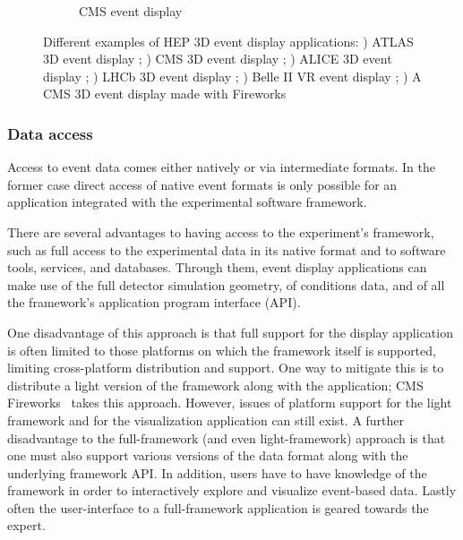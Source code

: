 \documentclass[12pt,a4paper]{article}
\begin{document}
\begin{figure}
\begin{subfigure}[b]{0.475\textwidth}
		\caption[CMS event display]%
		{{\small CMS event display}}
		\label{fig:ed-cms-fireworks}
	\end{subfigure}
	\caption[Examples of HEP event displays]
	{\small Different examples of HEP 3D event display applications: ) ATLAS 3D event display \cite{ATLASED072015,ATLASVP12010};
	) CMS 3D event display \cite{CMSED}; 
	) ALICE 3D event display \cite{ALICEED};
	) LHCb 3D event display \cite{LHCbED}; ) Belle II VR event display \cite{BelleIIVRED}; 
	) A CMS 3D event display made with Fireworks~\cite{CMSFireworks}}
	\label{fig:screenshots}
\end{figure}



\hypertarget{data-access}{%
\subsubsection{Data access}\label{data-access}}

Access to event data comes either natively or via intermediate formats. In the former case direct access of native event formats
is only possible for an application integrated with the experimental software framework.

There are several advantages to having access to the experiment's framework, such as full access to the experimental
data in its native format and to software tools, services, and databases. Through them, event display applications can
make use of the full detector simulation geometry, of conditions data, and of all the framework's application program interface (API).

One disadvantage of this approach is that full support for the display application is often limited to those platforms
on which the framework itself is supported, limiting cross-platform distribution and support.
One way to mitigate this is to distribute a light version of the framework along with the application; CMS Fireworks~\cite{CMSFireworks}
takes this approach. However, issues of platform support for the light framework and for the visualization application can still exist.
A further disadvantage to the full-framework (and even light-framework) approach is that one must also support various versions of
the data format along with the underlying framework API. In addition, users have to have knowledge of the framework in order to interactively
explore and visualize event-based data. Lastly often the user-interface to a
full-framework application is geared towards the expert.
\end{document}
